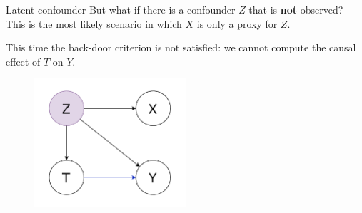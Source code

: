 \documentclass[10pt]{beamer}
\begin{document}
\begin{frame}{Latent confounder}
  But what if there is a confounder $Z$ that is \textbf{not} observed? This is the most likely scenario in which $X$ is only a proxy for $Z$.

  This time the back-door criterion is not satisfied: we cannot compute the causal effect of $T$ on $Y$.

  \begin{figure}
    \centering
    \includegraphics[width=0.5\textwidth]{images/latent.drawio.pdf}
  \end{figure}


\end{frame}
\end{document}
